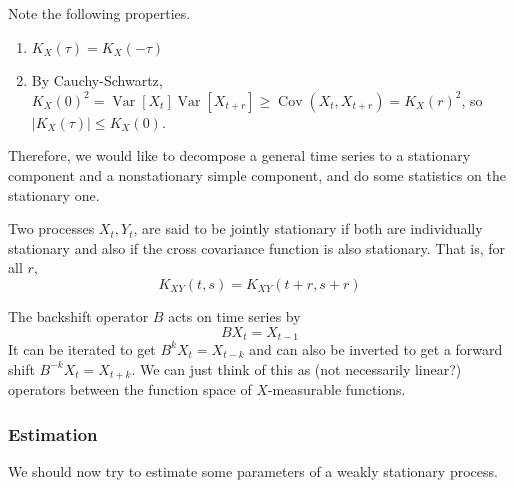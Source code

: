 \documentclass{article}
\DeclareMathOperator{\Cov}{Cov}
\DeclareMathOperator{\Var}{Var}
\begin{document}
    \begin{theorem}
      Note the following properties. 
      \begin{enumerate}
        \item $K_X (\tau) = K_X (- \tau)$ 
        \item By Cauchy-Schwartz, $K_X (0)^2 = \Var[X_t] \Var[X_{t+r}] \geq \Cov(X_t, X_{t+r}) = K_X (r)^2$, so $|K_X (\tau)| \leq K_X (0)$. 
      \end{enumerate}
    \end{theorem}

    Therefore, we would like to decompose a general time series to a stationary component and a nonstationary simple component, and do some statistics on the stationary one. 

    \begin{definition}
      Two processes $X_t, Y_t$, are said to be jointly stationary if both are individually stationary and also if the cross covariance function is also stationary. That is, for all $r$, 
      \begin{equation}
        K_{XY} (t, s) = K_{XY}(t + r, s + r)
      \end{equation}
    \end{definition}

    \begin{definition}
      The backshift operator $B$ acts on time series by 
      \begin{equation}
        B X_t = X_{t-1}
      \end{equation}
      It can be iterated to get $B^k X_t = X_{t-k}$ and can also be inverted to get a forward shift $B^{-k} X_t  = X_{t+k}$. We can just think of this as (not necessarily linear?) operators between the function space of $X$-measurable functions. 
    \end{definition}

    \subsubsection{Estimation}

      We should now try to estimate some parameters of a weakly stationary process. 
\end{document}
